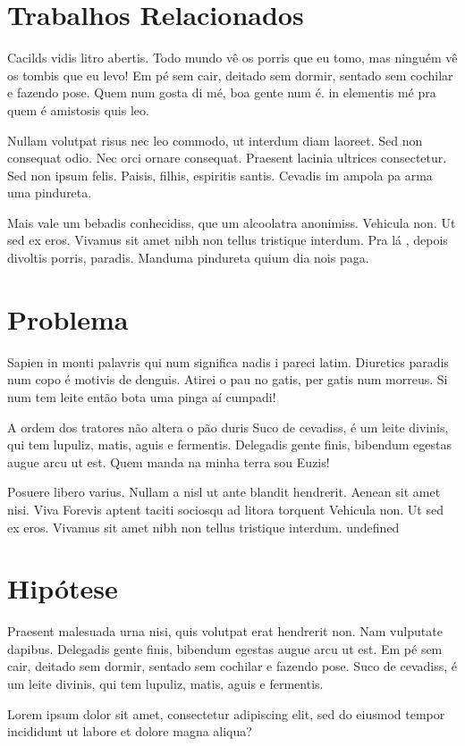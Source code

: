 \section{Trabalhos Relacionados}
Cacilds vidis litro abertis. Todo mundo vê os porris que eu tomo, mas ninguém vê os tombis que eu levo! Em pé sem cair, deitado sem dormir, sentado sem cochilar e fazendo pose. Quem num gosta di mé, boa gente num é. in elementis mé pra quem é amistosis quis leo.

Nullam volutpat risus nec leo commodo, ut interdum diam laoreet. Sed non consequat odio. Nec orci ornare consequat. Praesent lacinia ultrices consectetur. Sed non ipsum felis. Paisis, filhis, espiritis santis. Cevadis im ampola pa arma uma pindureta.

Mais vale um bebadis conhecidiss, que um alcoolatra anonimiss. Vehicula non. Ut sed ex eros. Vivamus sit amet nibh non tellus tristique interdum. Pra lá , depois divoltis porris, paradis. Manduma pindureta quium dia nois paga.

\section{Problema}
Sapien in monti palavris qui num significa nadis i pareci latim. Diuretics paradis num copo é motivis de denguis. Atirei o pau no gatis, per gatis num morreus. Si num tem leite então bota uma pinga aí cumpadi!

A ordem dos tratores não altera o pão duris Suco de cevadiss, é um leite divinis, qui tem lupuliz, matis, aguis e fermentis. Delegadis gente finis, bibendum egestas augue arcu ut est. Quem manda na minha terra sou Euzis!

Posuere libero varius. Nullam a nisl ut ante blandit hendrerit. Aenean sit amet nisi. Viva Forevis aptent taciti sociosqu ad litora torquent Vehicula non. Ut sed ex eros. Vivamus sit amet nibh non tellus tristique interdum. undefined 

\section{Hipótese}
Praesent malesuada urna nisi, quis volutpat erat hendrerit non. Nam vulputate dapibus. Delegadis gente finis, bibendum egestas augue arcu ut est. Em pé sem cair, deitado sem dormir, sentado sem cochilar e fazendo pose. Suco de cevadiss, é um leite divinis, qui tem lupuliz, matis, aguis e fermentis.
\begin{hipo}
Lorem ipsum dolor sit amet, consectetur adipiscing elit, sed do eiusmod tempor incididunt ut labore et dolore magna aliqua?
\end{hipo}



